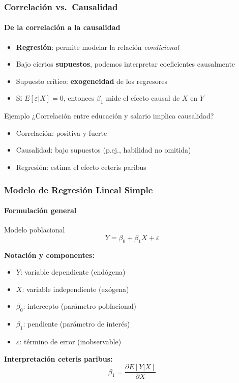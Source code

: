 \documentclass[aspectratio=169,11pt]{beamer}
\begin{document}
\begin{frame}
\frametitle{Correlación vs.\ Causalidad}
\framesubtitle{De la correlación a la causalidad}

\small
\setlength{\itemsep}{3pt}
\begin{itemize}
    \item \textbf{Regresión}: permite modelar la relación \textit{condicional}
    \item Bajo ciertos \textbf{supuestos}, podemos interpretar coeficientes causalmente
    \item Supuesto crítico: \textbf{exogeneidad} de los regresores
    \item Si $E[\varepsilon | X] = 0$, entonces $\beta_1$ mide el efecto causal de $X$ en $Y$
\end{itemize}

\vspace{0.6cm}
\begin{exampleblock}{Ejemplo}
    \footnotesize
    ¿Correlación entre educación y salario implica causalidad?
    \begin{itemize}
        \item Correlación: positiva y fuerte
        \item Causalidad: bajo supuestos (p.ej., habilidad no omitida)
        \item Regresión: estima el efecto ceteris paribus
    \end{itemize}
\end{exampleblock}
\end{frame}

\begin{frame}
\frametitle{Modelo de Regresión Lineal Simple}
\framesubtitle{Formulación general}

\begin{block}{Modelo poblacional}
$$Y = \beta_0 + \beta_1 X + \varepsilon$$
\end{block}

\small
\vspace{0.3cm}
\textbf{Notación y componentes:}
\setlength{\itemsep}{3pt}
\begin{itemize}
    \item $Y$: variable dependiente (endógena)
    \item $X$: variable independiente (exógena)
    \item $\beta_0$: intercepto (parámetro poblacional)
    \item $\beta_1$: pendiente (parámetro de interés)
    \item $\varepsilon$: término de error (inobservable)
\end{itemize}

\vspace{0.2cm}
\textbf{Interpretación ceteris paribus:}
$$\beta_1 = \frac{\partial E[Y|X]}{\partial X}$$
\end{frame}
\end{document}
